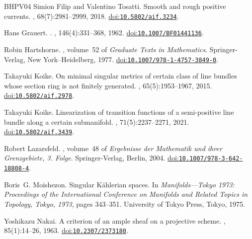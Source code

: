 \documentclass[11pt,a4paper]{article}
\numberwithin{equation}{section}
\theoremstyle{definition}
\theoremstyle{remark}
\begin{document}
\begin{thebibliography}{BHPV04}
Simion Filip and Valentino Tosatti.
\newblock Smooth and rough positive currents.
, 68(7):2981--2999, 2018.
\newblock \href{https://doi.org/10.5802/aif.3234}{doi:\nolinkurl{10.5802/aif.3234}}.

Hans Grauert.
.
, 146(4):331--368, 1962.
\newblock \href{https://doi.org/10.1007/BF01441136}{doi:\nolinkurl{10.1007/BF01441136}}.

Robin Hartshorne.
, volume~52 of {\em Graduate Texts in Mathematics}.
\newblock Springer-Verlag, New York--Heidelberg, 1977.
\newblock \href{https://doi.org/10.1007/978-1-4757-3849-0}{doi:\nolinkurl{10.1007/978-1-4757-3849-0}}.

Takayuki Koike.
\newblock On minimal singular metrics of certain class of line bundles whose section ring is not finitely generated.
, 65(5):1953--1967, 2015.
\newblock \href{https://doi.org/10.5802/aif.2978}{doi:\nolinkurl{10.5802/aif.2978}}.

Takayuki Koike.
\newblock Linearization of transition functions of a semi-positive line bundle along a certain submanifold.
, 71(5):2237--2271, 2021.
\newblock \href{https://doi.org/10.5802/aif.3439}{doi:\nolinkurl{10.5802/aif.3439}}.

Robert Lazarsfeld.
, volume~48 of {\em Ergebnisse der Mathematik und ihrer Grenzgebiete, 3. Folge}.
\newblock Springer-Verlag, Berlin, 2004.
\newblock \href{https://doi.org/10.1007/978-3-642-18808-4}{doi:\nolinkurl{10.1007/978-3-642-18808-4}}.

Boris~G. Moishezon.
\newblock Singular {K\"ahlerian} spaces.
\newblock In {\em Manifolds---Tokyo 1973: Proceedings of the International Conference on Manifolds and Related Topics in Topology, Tokyo, 1973}, pages 343--351. University of Tokyo Press, Tokyo, 1975.

Yoshikazu Nakai.
\newblock A criterion of an ample sheaf on a projective scheme.
, 85(1):14--26, 1963.
\newblock \href{https://doi.org/10.2307/2373180}{doi:\nolinkurl{10.2307/2373180}}.


\end{thebibliography}
\end{document}
